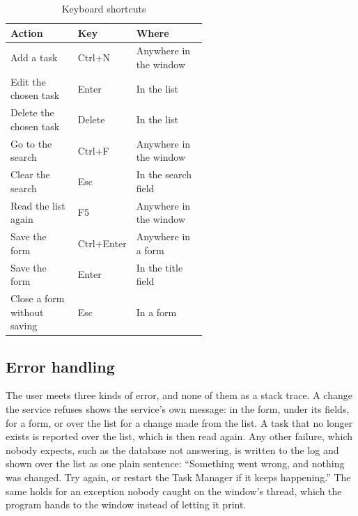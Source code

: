 \begin{table}[!t]
  \caption{Keyboard shortcuts}\label{tab:shortcuts}
  \centering\footnotesize
  \begin{tabularx}{\linewidth}{@{}YL{0.2\linewidth}L{0.36\linewidth}@{}}
    \toprule
    Action & Key & Where \\
    \midrule
    Add a task & Ctrl+N & Anywhere in the window \\
    Edit the chosen task & Enter & In the list \\
    Delete the chosen task & Delete & In the list \\
    Go to the search & Ctrl+F & Anywhere in the window \\
    Clear the search & Esc & In the search field \\
    Read the list again & F5 & Anywhere in the window \\
    Save the form & Ctrl+Enter & Anywhere in a form \\
    Save the form & Enter & In the title field \\
    Close a form without saving & Esc & In a form \\
    \bottomrule
  \end{tabularx}
\end{table}

\subsection{Error handling}

The user meets three kinds of error, and none of them as a stack trace. A change the service refuses shows the
service's own message: in the form, under its fields, for a form, or over the list for a change made from the list. A
task that no longer exists is reported over the list, which is then read again. Any other failure, which nobody
expects, such as the database not answering, is written to the log and shown over the list as one plain sentence:
``Something went wrong, and nothing was changed. Try again, or restart the Task Manager if it keeps happening.'' The
same holds for an exception nobody caught on the window's thread, which the program hands to the window instead of
letting it print.
